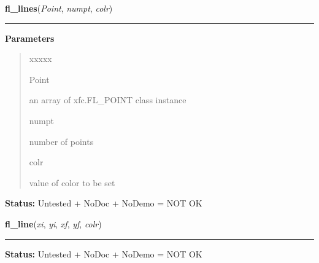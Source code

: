 \hspace{.8\funcindent}\begin{boxedminipage}{\funcwidth}

    \raggedright \textbf{fl\_lines}(\textit{Point}, \textit{numpt}, \textit{colr})

    \vspace{-1.5ex}

    \rule{\textwidth}{0.5\fboxrule}
\setlength{\parskip}{2ex}
\setlength{\parskip}{1ex}
      \textbf{Parameters}
      \vspace{-1ex}

      \begin{quote}
        \begin{Ventry}{xxxxx}

          \item[Point]

          an array of xfc.FL\_POINT class instance

          \item[numpt]

          number of points

          \item[colr]

          value of color to be set

        \end{Ventry}

      \end{quote}

\textbf{Status:} Untested + NoDoc + NoDemo = NOT OK



    \end{boxedminipage}

    \label{xformslib:library:fl_line}

    \vspace{0.5ex}

\hspace{.8\funcindent}\begin{boxedminipage}{\funcwidth}

    \raggedright \textbf{fl\_line}(\textit{xi}, \textit{yi}, \textit{xf}, \textit{yf}, \textit{colr})

    \vspace{-1.5ex}

    \rule{\textwidth}{0.5\fboxrule}
\setlength{\parskip}{2ex}
\setlength{\parskip}{1ex}
\textbf{Status:} Untested + NoDoc + NoDemo = NOT OK



    \end{boxedminipage}

